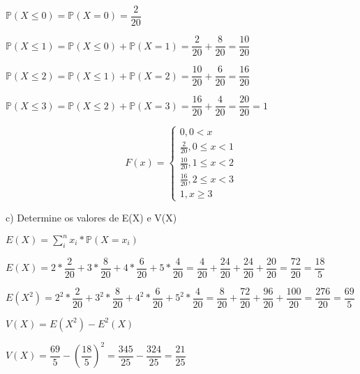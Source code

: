 \documentclass[12pt,a4paper]{article}
\begin{document}
\begin{center}
	\vspace{0.25cm}
	$\mathbb{P}(X\leq{0}) = \mathbb{P}(X=0) = \dfrac{2}{20}$
	
	\vspace{0.5cm}
	$\mathbb{P}(X\leq1) = \mathbb{P}(X\leq{0}) + \mathbb{P}(X=1) = \dfrac{2}{20} + \dfrac{8}{20} = \dfrac{10}{20}$
	
	\vspace{0.5cm}
	$\mathbb{P}(X\leq{2}) = \mathbb{P}(X\leq1) + \mathbb{P}(X=2) = \dfrac{10}{20} + \dfrac{6}{20} = \dfrac{16}{20}$
	
	\vspace{0.5cm}
	$\mathbb{P}(X\leq{3}) = \mathbb{P}(X\leq{2}) + \mathbb{P}(X=3) = \dfrac{16}{20} + \dfrac{4}{20} = \dfrac{20}{20} = 1$
	
	\[
	F(x) =
	\begin{cases}
	0, 0 < x \\
	\frac{2}{20}, 0\leq{x} < 1 \\
	\frac{10}{20}, 1\leq{x} < 2\\
	\frac{16}{20}, 2\leq{x} < 3\\
	1,x\geq{3}
	\end{cases}
	\]
	
	\vspace{1cm}
\end{center}

\vspace{1cm}
c) Determine os valores de E(X) e V(X)

\begin{center}
	\vspace{0.25cm}
	$E(X) = \sum_{i}^{n} x_{i}*\mathbb{P}(X = x_{i})$
	
	\vspace{1cm}
	$E(X) = 2*\dfrac{2}{20}+3*\dfrac{8}{20}+4*\dfrac{6}{20} + 5*\dfrac{4}{20} = \dfrac{4}{20} + \dfrac{24}{20} + \dfrac{24}{20} + \dfrac{20}{20} = \dfrac{72}{20} = \dfrac{18}{5}$
	
	\vspace{1cm}
	$E(X^{2}) = 2^{2}*\dfrac{2}{20}+3^{2}*\dfrac{8}{20}+4^{2}*\dfrac{6}{20} + 5^{2}*\dfrac{4}{20} = \dfrac{8}{20} + \dfrac{72}{20} + \dfrac{96}{20} + \dfrac{100}{20} = \dfrac{276}{20} = \dfrac{69}{5}$
	
	\vspace{1cm}
	$V(X) = E(X^{2}) - E^{2}(X)$
	
	\vspace{1cm}
	$V(X) = \dfrac{69}{5}-(\dfrac{18}{5})^{2} = \dfrac{345}{25}-\dfrac{324}{25} = \dfrac{21}{25}$
\end{center}
\end{document}
